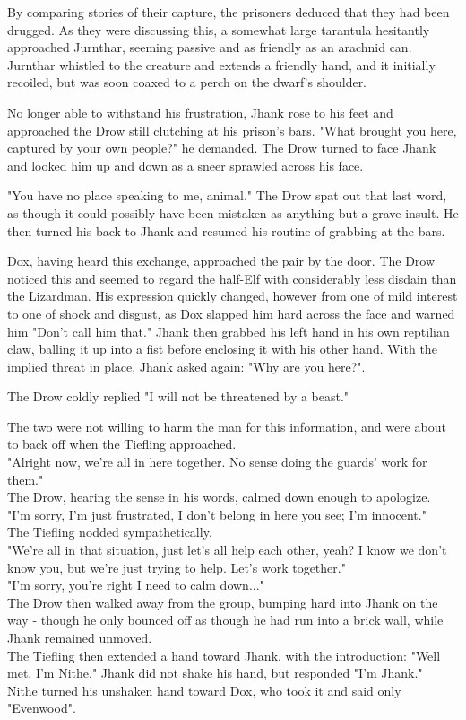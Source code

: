 \documentclass[letterpaper,10pt,twoside,twocolumn,openany]{book}
\begin{document}
By comparing stories of their capture, the prisoners deduced that they had been drugged. As they were discussing this, a somewhat large tarantula hesitantly approached Jurnthar, seeming passive and as friendly as an arachnid can. Jurnthar whistled to the creature and extends a friendly hand, and it initially recoiled, but was soon coaxed to a perch on the dwarf's shoulder.

No longer able to withstand his frustration, Jhank rose to his feet and approached the Drow still clutching at his prison's bars. "What brought you here, captured by your own people?" he demanded. The Drow turned to face Jhank and looked him up and down as a sneer sprawled across his face.

"You have no place speaking to me, animal." The Drow spat out that last word, as though it could possibly have been mistaken as anything but a grave insult. He then turned his back to Jhank and resumed his routine of grabbing at the bars.

Dox, having heard this exchange, approached the pair by the door. The Drow noticed this and seemed to regard the half-Elf with considerably less disdain than the Lizardman. His expression quickly changed, however from one of mild interest to one of shock and disgust, as Dox slapped him hard across the face and warned him "Don't call him that." Jhank then grabbed his left hand in his own reptilian claw, balling it up into a fist before enclosing it with his other hand. With the implied threat in place, Jhank asked again: "Why are you here?".

The Drow coldly replied "I will not be threatened by a beast."

The two were not willing to harm the man for this information, and were about to back off when the Tiefling approached.\\
"Alright now, we're all in here together. No sense doing the guards' work for them."\\
The Drow, hearing the sense in his words, calmed down enough to apologize.\\
"I'm sorry, I'm just frustrated, I don't belong in here you see; I'm innocent."\\
The Tiefling nodded sympathetically.\\
"We're all in that situation, just let's all help each other, yeah? I know we don't know you, but we're just trying to help. Let's work together."\\
"I'm sorry, you're right I need to calm down..."\\
The Drow then walked away from the group, bumping hard into Jhank on the way - though he only bounced off as though he had run into a brick wall, while Jhank remained unmoved.\\
The Tiefling then extended a hand toward Jhank, with the introduction: "Well met, I'm Nithe." Jhank did not shake his hand, but responded "I'm Jhank."\\
Nithe turned his unshaken hand toward Dox, who took it and said only "Evenwood".
\end{document}
